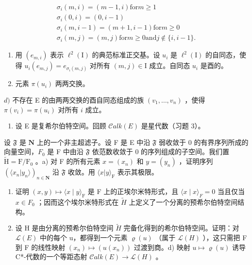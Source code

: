 \[
\begin{array}{c} \sigma_ {i} (m, i) = (m - 1, i) \text {for} m \geqslant 1 \\ \sigma_ {i} (0, i) = (0, i - 1) \\ \sigma_ {i} (m, i - 1) = (m + 1, i - 1) \text {for} m \geqslant 0 \\ \sigma_ {i} (m, j) = (m, j) \text {for} m \geqslant 0 \text {and} j \notin \{i, i - 1 \}. \end{array}
\]

\begin{enumerate}
\def\labelenumi{\alph{enumi})}
\setcounter{enumi}{1}
\item
  用 \((e_{m,i})\) 表示 \(\ell^{2}(\mathrm{I})\) 的典范标准正交基。设 \(u_{i}\) 是 \(\ell^{2}(\mathrm{I})\) 的自同态，使得 \(u_{i}(e_{m,j}) = e_{\sigma_{i}(m,j)}\) 对所有 \((m,j) \in \mathrm{I}\) 成立。自同态 \(u_{i}\) 是酉的。
\item
  元素 \(\pi(u_i)\) 两两交换。
\end{enumerate}

\(d)\) 不存在 E 的由两两交换的酉自同态组成的族 \((v_{1},\ldots,v_{n})\) ，使得 \(\pi(v_{i})=\pi(u_{i})\) 对所有 \(i\) 成立。

\begin{enumerate}
\def\labelenumi{\arabic{enumi})}
\setcounter{enumi}{5}
\tightlist
\item
  设 E 是复希尔伯特空间。回顾 \(\mathcal{C}alk(E)\) 是星代数（习题 3）。
\end{enumerate}

  设 \(\mathfrak{F}\) 是 \(\mathbf{N}\) 上的一个非主超滤子。设 F 是 E 中沿 \(\mathfrak{F}\) 弱收敛于 0 的有界序列所成的向量空间，\(F_0\) 是 F 中由沿 \(\mathfrak{F}\) 依范数收敛于 0 的序列组成的子空间。我们置 \(\widetilde{\mathrm{H}} = \mathrm{F} / \mathrm{F}_0\) 。a) 对 F 的所有元素 \(x = (x_n)\) 和 \(y = (y_n)\) ，证明序列 \((\langle x_n | y_n \rangle)_{n \in \mathbf{N}}\) 沿 \(\mathfrak{F}\) 收敛。用 \(\langle x | y \rangle_{\mathrm{F}}\) 表示其极限。

\begin{enumerate}
\def\labelenumi{\alph{enumi})}
\setcounter{enumi}{1}
\item
  证明 \((x,y)\mapsto\langle x\mid y\rangle_{\mathrm{F}}\) 是 F 上的正埃尔米特形式，且 \(\langle x\mid x\rangle_{F}=0\) 当且仅当 \(x\in F_{0}\) ；因而这个埃尔米特形式在 \(\widetilde{H}\) 上定义了一个分离的预希尔伯特空间结构。
\item
  设 H 是由分离的预希尔伯特空间 \(\widetilde{H}\) 完备化得到的希尔伯特空间。证明：对 \(\mathcal{L}(E)\) 中的每个 u，都得到一个元素 \(\varrho(u)\) （属于 \(\mathcal{L}(H)\) ），这只需把 F 到 F 的线性映射 \((x_{n})\mapsto(u(x_{n}))\) 过渡到商。d) 映射 \(u\mapsto\varrho(u)\) 诱导 C*-代数的一个等距态射 \(\mathcal{C}alk(E)\to\mathcal{L}(H)\) 。
\end{enumerate}

